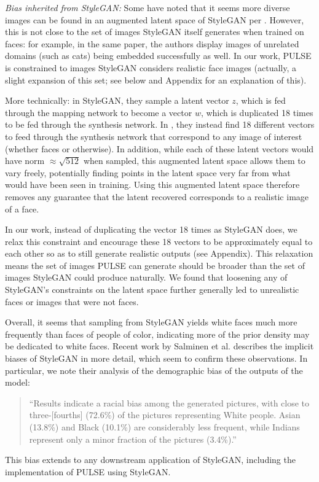 \documentclass[10pt,twocolumn,letterpaper]{article}
\begin{document}
\noindent\textit{Bias inherited from StyleGAN:} Some have noted that it seems more diverse images can be found in an augmented latent space of StyleGAN per \cite{styleganembedding}. However, this is not close to the set of images StyleGAN itself generates when trained on faces: for example, in the same paper, the authors display images of unrelated domains (such as cats) being embedded successfully as well. In our work, PULSE is constrained to images StyleGAN considers realistic face images (actually, a slight expansion of this set; see below and Appendix for an explanation of this).
    
More technically: in StyleGAN, they sample a latent vector $z$, which is fed through the mapping network to become a vector $w$, which is duplicated 18 times to be fed through the synthesis network. In \cite{styleganembedding}, they instead find 18 different vectors to feed through the synthesis network that correspond to any image of interest (whether faces or otherwise). In addition, while each of these latent vectors would have norm $\approx \sqrt{512}$ when sampled, this augmented latent space allows them to vary freely, potentially finding points in the latent space very far from what would have been seen in training. Using this augmented latent space therefore removes any guarantee that the latent recovered corresponds to a realistic image of a face. 
    
In our work, instead of duplicating the vector 18 times as StyleGAN does, we relax this constraint and encourage these 18 vectors to be approximately equal to each other so as to still generate realistic outputs (see Appendix). This relaxation means the set of images PULSE can generate should be broader than the set of images StyleGAN could produce naturally. We found that loosening any of StyleGAN's constraints on the latent space further generally led to unrealistic faces or images that were not faces.

Overall, it seems that sampling from StyleGAN yields white faces much more frequently than faces of people of color, indicating more of the prior density may be dedicated to white faces. Recent work by Salminen et al. \cite{Salminen_Jung_Chowdhury_Jansen_2020b} describes the implicit biases of StyleGAN in more detail, which seem to confirm these observations. In particular, we note their analysis of the demographic bias of the outputs of the model:
\begin{quote}
“Results indicate a racial bias among the generated pictures, with close to three-[fourths] (72.6\%) of the pictures representing White people. Asian (13.8\%) and Black (10.1\%) are considerably less frequent, while Indians represent only a minor fraction of the pictures (3.4\%).”
\end{quote}
This bias extends to any downstream application of StyleGAN, including the implementation of PULSE using StyleGAN.
\end{document}
